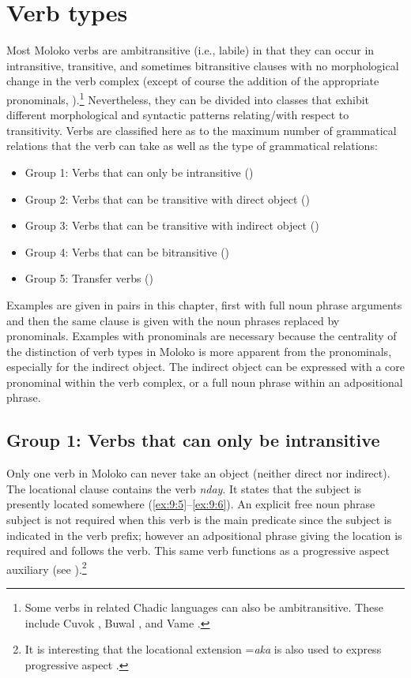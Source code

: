 \section{Verb types}\label{sec:9.2}
\hypertarget{RefHeading1212661525720847}{}
Most Moloko verbs are ambitransitive (i.e., labile) in that they can occur in intransitive, transitive, and sometimes bitransitive clauses with no morphological change in the verb complex (except of course the addition of the appropriate pronominals, ).\footnote{Some verbs in related Chadic languages can also be ambitransitive. These include Cuvok \citep{Ndokobai2006},  Buwal \citep{Viljoen2013}, and Vame \citep{Kinnaird2006}.} Nevertheless, they can be divided into classes that exhibit different morphological and syntactic patterns relating/with respect to transitivity. Verbs are classified here as to the maximum number of grammatical relations that the verb can take as well as the type of grammatical relations: %

\largerpage
\begin{itemize}
\item Group 1: Verbs that can only be intransitive ()
\item Group 2: Verbs that can be transitive with direct object ()
\item Group 3: Verbs that can be transitive with indirect object ()
\item Group 4: Verbs that can be bitransitive ()
\item Group 5: Transfer verbs ()
\end{itemize}

Examples are given in pairs in this chapter, first with full noun phrase arguments and then the same clause is given with the noun phrases replaced by pronominals. Examples with pronominals are necessary because the centrality of the distinction of verb types in Moloko is more apparent from the pronominals, especially for the indirect object. The indirect object can be expressed with a core pronominal within the verb complex, or a full noun phrase within an adpositional phrase. 

\subsection{Group 1: Verbs that can only be intransitive}\label{sec:9.2.1}
\hypertarget{RefHeading1212681525720847}{}
Only one verb in Moloko can never take an object (neither direct nor indirect). The locational clause contains the verb \textit{nday}. It states that the subject is presently located somewhere (\ref{ex:9:5}--\ref{ex:9:6}). An explicit free noun phrase subject is not required when this verb is the main predicate since the subject is indicated in the verb prefix; however an adpositional phrase giving the location is required and follows the verb. This same verb functions as a progressive aspect auxiliary (see ).\footnote{It is interesting that the locational extension =\textit{aka} is also used to express progressive aspect .}

